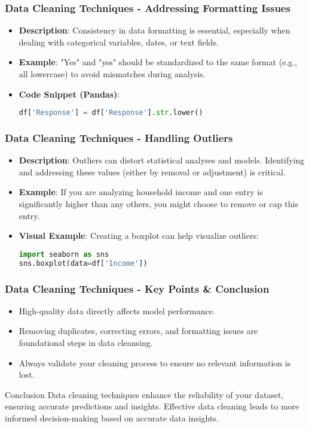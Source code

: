 \documentclass[aspectratio=169]{beamer}
\begin{document}
\begin{frame}[fragile]
    \frametitle{Data Cleaning Techniques - Addressing Formatting Issues}
    \begin{itemize}
        \item \textbf{Description}: Consistency in data formatting is essential, especially when dealing with categorical variables, dates, or text fields.
        \item \textbf{Example}: "Yes" and "yes" should be standardized to the same format (e.g., all lowercase) to avoid mismatches during analysis.
        \item \textbf{Code Snippet (Pandas)}:
        \begin{lstlisting}[language=python]
df['Response'] = df['Response'].str.lower()
        \end{lstlisting}
    \end{itemize}
\end{frame}

\begin{frame}[fragile]
    \frametitle{Data Cleaning Techniques - Handling Outliers}
    \begin{itemize}
        \item \textbf{Description}: Outliers can distort statistical analyses and models. Identifying and addressing these values (either by removal or adjustment) is critical.
        \item \textbf{Example}: If you are analyzing household income and one entry is significantly higher than any others, you might choose to remove or cap this entry.
        \item \textbf{Visual Example}: Creating a boxplot can help visualize outliers:
        \begin{lstlisting}[language=python]
import seaborn as sns
sns.boxplot(data=df['Income'])
        \end{lstlisting}
    \end{itemize}
\end{frame}

\begin{frame}[fragile]
    \frametitle{Data Cleaning Techniques - Key Points & Conclusion}
    \begin{itemize}
        \item High-quality data directly affects model performance.
        \item Removing duplicates, correcting errors, and formatting issues are foundational steps in data cleansing.
        \item Always validate your cleaning process to ensure no relevant information is lost.
    \end{itemize}
    \begin{block}{Conclusion}
        Data cleaning techniques enhance the reliability of your dataset, ensuring accurate predictions and insights. Effective data cleaning leads to more informed decision-making based on accurate data insights.
    \end{block}
\end{frame}
\end{document}
